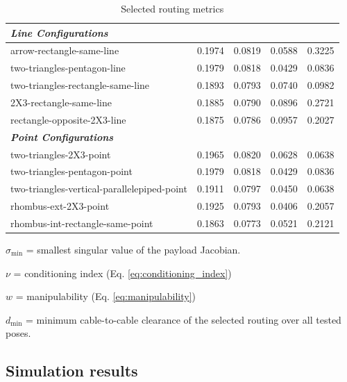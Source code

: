 \begin{table}[htbp]
\begin{threeparttable}
\begin{tabular}{lcccc}
\midrule
\multicolumn{5}{l}{\textit{\textbf{Line Configurations}}} \\
\midrule
arrow-rectangle-same-line                              & 0.1974 & 0.0819 & 0.0588 & 0.3225 \\
two-triangles-pentagon-line                            & 0.1979 & 0.0818 & 0.0429 & 0.0836 \\
two-triangles-rectangle-same-line                      & 0.1893 & 0.0793 & 0.0740 & 0.0982 \\
2X3-rectangle-same-line                                & 0.1885 & 0.0790 & 0.0896 & 0.2721 \\
rectangle-opposite-2X3-line                            & 0.1875 & 0.0786 & 0.0957 & 0.2027 \\
\midrule
\multicolumn{5}{l}{\textit{\textbf{Point Configurations}}} \\
\midrule
two-triangles-2X3-point                                & 0.1965 & 0.0820 & 0.0628 & 0.0638 \\
two-triangles-pentagon-point                           & 0.1979 & 0.0818 & 0.0429 & 0.0836 \\
two-triangles-vertical-parallelepiped-point            & 0.1911 & 0.0797 & 0.0450 & 0.0638 \\
rhombus-ext-2X3-point                                  & 0.1925 & 0.0793 & 0.0406 & 0.2057 \\
rhombus-int-rectangle-same-point                       & 0.1863 & 0.0773 & 0.0521 & 0.2121 \\
\bottomrule
\end{tabular}
\caption{Selected routing metrics}
\label{tab:pre-screening_UAVs}
\begin{tablenotes}
\footnotesize
\item[a] $\sigma_{\min}$ = smallest singular value of the payload Jacobian.
\item[b] $\nu$ = conditioning index (Eq. \eqref{eq:conditioning_index})
\item[c] $w$ = manipulability (Eq. \eqref{eq:manipulability})
\item[d] $d_{\min}$ = minimum cable-to-cable clearance of the selected routing over all tested poses.
\end{tablenotes}
\end{threeparttable}
\end{table}

\newpage
\subsection{Simulation results}
\label{app:UAVconnectionSimulation}

